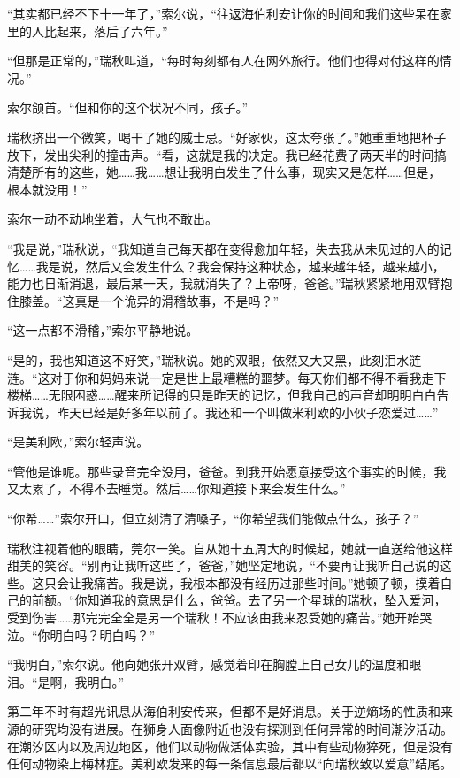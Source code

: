 \documentclass[AutoFakeBold=true]{book}
\begin{document}
``其实都已经不下十一年了，''索尔说，``往返海伯利安让你的时间和我们这些呆在家里的人比起来，落后了六年。''

``但那是正常的，''瑞秋叫道，``每时每刻都有人在网外旅行。他们也得对付这样的情况。''

索尔颌首。``但和你的这个状况不同，孩子。''

瑞秋挤出一个微笑，喝干了她的威士忌。``好家伙，这太夸张了。''她重重地把杯子放下，发出尖利的撞击声。``看，这就是我的决定。我已经花费了两天半的时间搞清楚所有的这些，她……我……想让我明白发生了什么事，现实又是怎样……但是，根本就没用！''

索尔一动不动地坐着，大气也不敢出。

``我是说，''瑞秋说，``我知道自己每天都在变得愈加年轻，失去我从未见过的人的记忆……我是说，然后又会发生什么？我会保持这种状态，越来越年轻，越来越小，能力也日渐消退，最后某一天，我就消失了？上帝呀，爸爸。''瑞秋紧紧地用双臂抱住膝盖。``这真是一个诡异的滑稽故事，不是吗？''

``这一点都不滑稽，''索尔平静地说。

``是的，我也知道这不好笑，''瑞秋说。她的双眼，依然又大又黑，此刻泪水涟涟。``这对于你和妈妈来说一定是世上最糟糕的噩梦。每天你们都不得不看我走下楼梯……无限困惑……醒来所记得的只是昨天的记忆，但我自己的声音却明明白白告诉我说，昨天已经是好多年以前了。我还和一个叫做米利欧的小伙子恋爱过……''

``是美利欧，''索尔轻声说。

``管他是谁呢。那些录音完全没用，爸爸。到我开始愿意接受这个事实的时候，我又太累了，不得不去睡觉。然后……你知道接下来会发生什么。''

``你希……''索尔开口，但立刻清了清嗓子，``你希望我们能做点什么，孩子？''

瑞秋注视着他的眼睛，莞尔一笑。自从她十五周大的时候起，她就一直送给他这样甜美的笑容。``别再让我听这些了，爸爸，''她坚定地说，``不要再让我听自己说的这些。这只会让我痛苦。我是说，我根本都没有经历过那些时间。''她顿了顿，摸着自己的前额。``你知道我的意思是什么，爸爸。去了另一个星球的瑞秋，坠入爱河，受到伤害……那完完全全是另一个瑞秋！不应该由我来忍受她的痛苦。''她开始哭泣。``你明白吗？明白吗？''

``我明白，''索尔说。他向她张开双臂，感觉着印在胸膛上自己女儿的温度和眼泪。``是啊，我明白。''

\vspace*{1em}

第二年不时有超光讯息从海伯利安传来，但都不是好消息。关于逆熵场的性质和来源的研究均没有进展。在狮身人面像附近也没有探测到任何异常的时间潮汐活动。在潮汐区内以及周边地区，他们以动物做活体实验，其中有些动物猝死，但是没有任何动物染上梅林症。美利欧发来的每一条信息最后都以``向瑞秋致以爱意''结尾。
\end{document}
